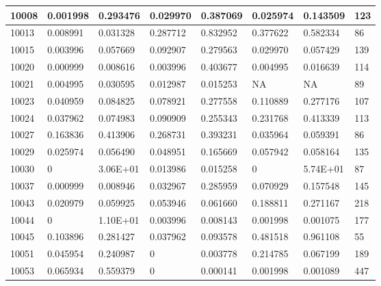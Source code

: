 \begin{table}[H]
{\begin{tabular}{|l|l|l|l|l|l|l|l|}
				10008 & {\color{red}0.001998} & 0.293476 & {\color{red}0.029970} & 0.387069 & {\color{red}0.025974} & 0.143509 & 123 \\ \hline
				10013 & {\color{red}0.008991} & {\color{red}0.031328} & 0.287712 & 0.832952 & 0.377622 & 0.582334 & 86 \\ \hline
				10015 & {\color{red}0.003996} & 0.057669 & 0.092907 & 0.279563 & {\color{red}0.029970} & 0.057429 & 139 \\ \hline
				10020 & {\color{red}0.000999} & {\color{red}0.008616} & {\color{red}0.003996} & 0.403677 & {\color{red}0.004995} & {\color{red}0.016639} & 114 \\ \hline
				10021 & {\color{red}0.004995} & {\color{red}0.030595} & {\color{red}0.012987} & {\color{red}0.015253} & NA & NA & 89 \\ \hline
				10023 & {\color{red}0.040959} & 0.084825 & 0.078921 & 0.277558 & 0.110889 & 0.277176 & 107 \\ \hline
				10024 & {\color{red}0.037962} & 0.074983 & 0.090909 & 0.255343 & 0.231768 & 0.413339 & 113 \\ \hline
				10027 & 0.163836 & 0.413906 & 0.268731 & 0.393231 & {\color{red}0.035964} & 0.059391 & 86 \\ \hline
				10029 & {\color{red}0.025974} & 0.056490 & {\color{red}0.048951} & 0.165669 & 0.057942 & 0.058164 & 135 \\ \hline
				10030 & {\color{red}0} & 3.06E+01 & {\color{red}0.013986} & {\color{red}0.015258} & {\color{red}0} & 5.74E+01 & 87 \\ \hline
				10037 & {\color{red}0.000999} & {\color{red}0.008946} & {\color{red}0.032967} & 0.285959 & 0.070929 & 0.157548 & 145 \\ \hline
				10043 & {\color{red}0.020979} & 0.059925 & 0.053946 & 0.061660 & 0.188811 & 0.271167 & 218 \\ \hline
				10044 & {\color{red}0} & 1.10E+01 & {\color{red}0.003996} & {\color{red}0.008143} & {\color{red}0.001998} & {\color{red}0.001075} & 177 \\ \hline
				10045 & 0.103896 & 0.281427 & {\color{red}0.037962} & 0.093578 & 0.481518 & 0.961108 & 55 \\ \hline
				10051 & {\color{red}0.045954} & 0.240987 & {\color{red}0} & {\color{red}0.003778} & 0.214785 & 0.067199 & 189 \\ \hline
				10053 & 0.065934 & 0.559379 & {\color{red}0} & {\color{red}0.000141} & {\color{red}0.001998} & {\color{red}0.001089} & 447 \\ \hline

\end{tabular}}
\end{table}
